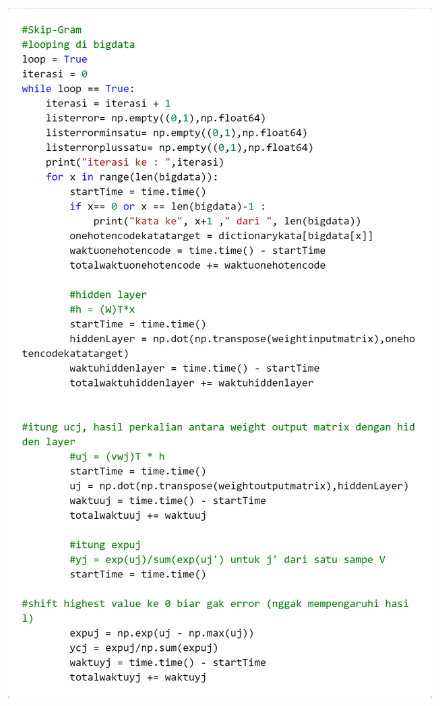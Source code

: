 \documentclass[12pt]{report}
\begin{document}
\begin{figure}[H]
\centering
\includegraphics[scale=0.3]{training3}
\end{figure}
\end{document}
